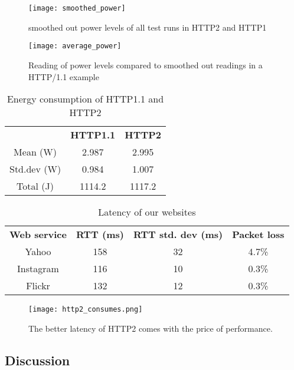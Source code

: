 \documentclass{article}
\begin{document}
\begin{figure}[h!]
\centering
\texttt{[image: smoothed\_power]}
\caption{smoothed out power levels of all test runs in HTTP2 and HTTP1 }
\label{fig:smoothed_power}
\end{figure}

\begin{figure}[h!]
\centering
\texttt{[image: average\_power]}
\caption{Reading of power levels compared to smoothed out readings in a HTTP/1.1 example}
\label{fig:average_power}
\end{figure}

\begin{table}[]
    \centering
    \begin{tabular}{c|c|c}
        & \textbf{HTTP1.1} & \textbf{HTTP2}  \\
        Mean (W)   & 2.987 & 2.995 \\
        Std.dev (W) & 0.984 & 1.007 \\
        Total (J)  & 1114.2 & 1117.2 \\
    \end{tabular}
    \caption{Energy consumption of HTTP1.1 and HTTP2}
    \label{table:energy_consumption}
\end{table}


\begin{table}[]
    \centering
    \begin{tabular}{c|c|c|c}
         \textbf{Web service} & \textbf{RTT (ms)} & \textbf{RTT std. dev (ms)} & \textbf{Packet loss} \\
        Yahoo   & 158 & 32 & 4.7\% \\
        Instagram  & 116 & 10 & 0.3\% \\
        Flickr & 132 & 12 & 0.3\% \\
    \end{tabular}
    \caption{Latency of our websites}
    \label{table:latency}
\end{table}



\begin{figure}[h!]
\centering
\texttt{[image: http2\_consumes.png]}
\caption{The better latency of HTTP2 comes with the price of performance.}
\label{fig:weather.com}
\end{figure}

\subsection{Discussion}
\label{chapter:discussion}
\end{document}
